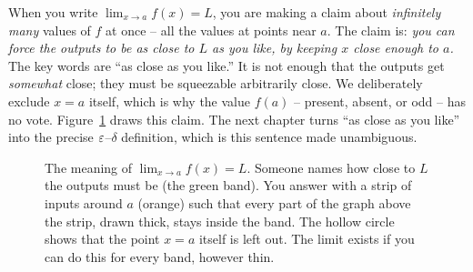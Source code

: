 \begin{happeningbox}
When you write $\lim_{x\to a} f(x) = L$, you are making a claim about \emph{infinitely many}
values of $f$ at once -- all the values at points near $a$. The claim is: \emph{you can force
the outputs to be as close to $L$ as you like, by keeping $x$ close enough to $a$.} The key
words are ``as close as you like.'' It is not enough that the outputs get
\emph{somewhat} close; they must be squeezable arbitrarily close. We deliberately exclude
$x = a$ itself, which is why the value $f(a)$ -- present, absent, or
odd -- has no vote. Figure~\ref{ch05:band} draws this claim. The next chapter turns
``as close as you like'' into the precise $\varepsilon$--$\delta$ definition, which is this sentence
made unambiguous.
\end{happeningbox}

\begin{figure}[htbp]
\centering
{}
\caption{The meaning of $\lim_{x\to a} f(x) = L$. Someone names how close to $L$ the outputs
must be (the green band). You answer with a strip of inputs around $a$ (orange) such that every
part of the graph above the strip, drawn thick, stays inside the band. The hollow circle shows
that the point $x=a$ itself is left out. The limit exists if you can do this for every band, however
thin.}
\label{ch05:band}
\end{figure}

